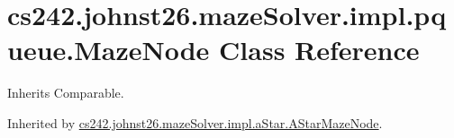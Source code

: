 \hypertarget{classcs242_1_1johnst26_1_1maze_solver_1_1impl_1_1pqueue_1_1_maze_node}{\section{cs242.\-johnst26.\-maze\-Solver.\-impl.\-pqueue.\-Maze\-Node Class Reference}
\label{classcs242_1_1johnst26_1_1maze_solver_1_1impl_1_1pqueue_1_1_maze_node}
}


Inherits Comparable.



Inherited by \hyperlink{classcs242_1_1johnst26_1_1maze_solver_1_1impl_1_1a_star_1_1_a_star_maze_node}{cs242.\-johnst26.\-maze\-Solver.\-impl.\-a\-Star.\-A\-Star\-Maze\-Node}.

